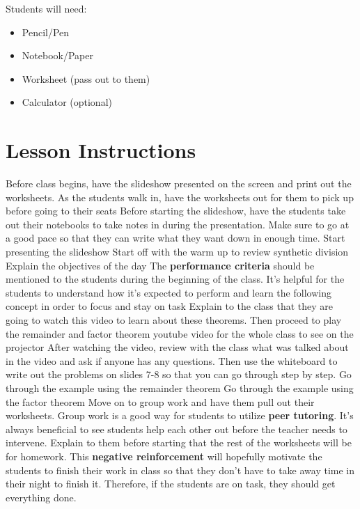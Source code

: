 Students will need:
\begin{itemize}
    \item Pencil/Pen
    \item Notebook/Paper
    \item Worksheet (pass out to them)
    \item Calculator (optional)
\end{itemize}

\section{Lesson Instructions}

\begin{outline}
    \1 Before class begins, have the slideshow presented on the screen and print out the worksheets. 
    \1 As the students walk in, have the worksheets out for them to pick up before going to their seats
    \1 Before starting the slideshow, have the students take out their notebooks to take notes in during the presentation. Make sure to go at a good pace so that they can write what they want down in enough time. 
    \1 Start presenting the slideshow
        \2 Start off with the warm up to review synthetic division
        \2 Explain the objectives of the day
            \3 The \textbf{performance criteria} should be mentioned to the students during the beginning of the class. It's helpful for the students to understand how it's expected to perform and learn the following concept in order to focus and stay on task
        \2 Explain to the class that they are going to watch this video to learn about these theorems. Then proceed to play the remainder and factor theorem youtube video for the whole class to see on the projector
        \2 After watching the video, review with the class what was talked about in the video and ask if anyone has any questions.
        \2 Then use the whiteboard to write out the problems on slides 7-8 so that you can go through step by step. 
        \2 Go through the example using the remainder theorem
        \2 Go through the example using the factor theorem
    \1 Move on to group work and have them pull out their worksheets. 
        \2 Group work is a good way for students to utilize \textbf{peer tutoring}. It's always beneficial to see students help each other out before the teacher needs to intervene. 
    \1 Explain to them before starting that the rest of the worksheets will be for homework. 
        \2 This \textbf{negative reinforcement} will hopefully motivate the students to finish their work in class so that they don't have to take away time in their night to finish it. Therefore, if the students are on task, they should get everything done. 

\end{outline}
